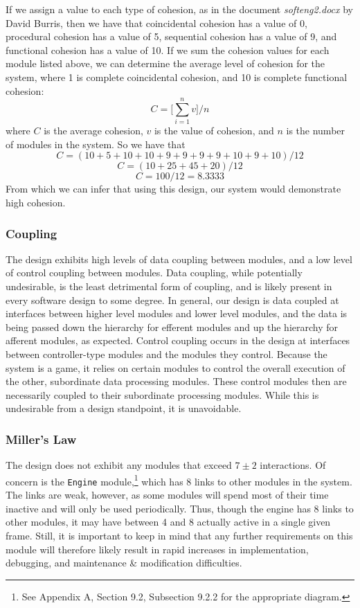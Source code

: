 \documentclass{article}
\begin{document}
			If we assign a value to each type of cohesion, as in the document \emph{softeng2.docx} by David Burris, then we have that coincidental cohesion has a value of 0, procedural cohesion has a value of 5, sequential cohesion has a value of 9, and functional cohesion has a value of 10. If we sum the cohesion values for each module listed above, we can determine the average level of cohesion for the system, where 1 is complete coincidental cohesion, and 10 is complete functional cohesion:
			$$C = \Bigg[\sum_{i=1}^{n}v\Bigg] /n$$
			where $C$ is the average cohesion, $v$ is the value of cohesion, and $n$ is the number of modules in the system. So we have that
			$$C = (10 + 5 + 10 + 10 + 9 + 9 + 9 + 9 + 10 + 9 + 10)/12$$
			$$C = (10 + 25 + 45 + 20)/12$$
			$$C = 100/12 = 8.3333$$
			From which we can infer that using this design, our system would demonstrate high cohesion. 
		\subsubsection{Coupling}
			The design exhibits high levels of data coupling between modules, and a low level of control coupling between modules. Data coupling, while potentially undesirable, is the least detrimental form of coupling, and is likely present in every software design to some degree. In general, our design is data coupled at interfaces between higher level modules and lower level modules, and the data is being passed down the hierarchy for efferent modules and up the hierarchy for afferent modules, as expected. Control coupling occurs in the design at interfaces between controller-type modules and the modules they control. Because the system is a game, it relies on certain modules to control the overall execution of the other, subordinate data processing modules. These control modules then are necessarily coupled to their subordinate processing modules. While this is undesirable from a design standpoint, it is unavoidable. 
		\subsubsection{Miller's Law}
			The design does not exhibit any modules that exceed $7\pm2$ interactions. Of concern is the \texttt{Engine} module,\footnote{See Appendix A, Section 9.2, Subsection 9.2.2 for the appropriate diagram.} which has 8 links to other modules in the system. The links are weak, however, as some modules will spend most of their time inactive and will only be used periodically. Thus, though the engine has 8 links to other modules, it may have between 4 and 8 actually active in a single given frame. Still, it is important to keep in mind that any further requirements on this module will therefore likely result in rapid increases in implementation, debugging, and maintenance \& modification difficulties. 
			
\end{document}
